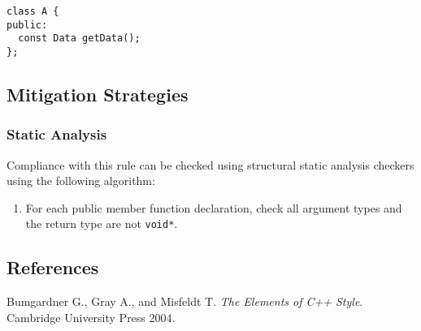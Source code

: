 \begin{verbatim}
class A {
public:
  const Data getData();
};
\end{verbatim}

\subsection{Mitigation Strategies}
\subsubsection{Static Analysis}

Compliance with this rule can be checked using structural static
analysis checkers using the following algorithm:

\begin{enumerate}
\item For each public member function declaration, check all argument types
  and the return type are not \texttt{void*}.
\end{enumerate}

\subsection{References}

Bumgardner G., Gray A., and Misfeldt T. {\it The Elements of C++
Style}. Cambridge University Press 2004.
